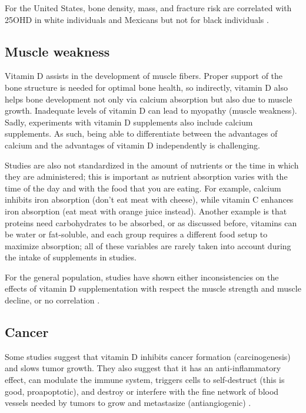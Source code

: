 For the United States, bone density, mass, and fracture risk are correlated with 25OHD in white individuals and Mexicans but not for black individuals \cite{ref:Brown2018, ref:Aloia2019, ref:Aloia2005}.


\subsection{Muscle weakness}

Vitamin D assists in the development of muscle fibers. Proper support of the bone structure is needed for optimal bone health, so indirectly, vitamin D also helps bone development not only via calcium absorption but also due to muscle growth. Inadequate levels of vitamin D can lead to myopathy (muscle weakness). Sadly, experiments with vitamin D supplements also include calcium supplements. As such, being able to differentiate between the advantages of calcium and the advantages of vitamin D independently is challenging.

Studies are also not standardized in the amount of nutrients or the time in which they are administered; this is important as nutrient absorption varies with the time of the day and with the food that you are eating. For example, calcium inhibits iron absorption (don't eat meat with cheese), while vitamin C enhances iron absorption \cite{ref:Li2020, ref:Lynch1980, ref:Li2020}(eat meat with orange juice instead). Another example is that proteins need carbohydrates to be absorbed, or as discussed before, vitamins can be water or fat-soluble, and each group requires a different food setup to maximize absorption; all of these variables are rarely taken into account during the intake of supplements in studies.

For the general population, studies have shown either inconsistencies \cite{ref:screeningErin2014} on the effects of vitamin D supplementation with respect the muscle strength and muscle decline, or no correlation \cite{ref:Shea2019,ref:Vaes2018}.


\subsection{Cancer}

Some studies suggest that vitamin D inhibits cancer formation (carcinogenesis) and slows tumor growth. They also suggest that it has an anti-inflammatory effect, can modulate the immune system, triggers cells to self-destruct (this is good, proapoptotic), and  destroy or interfere with the fine network of blood vessels needed by tumors to grow and metastasize (antiangiogenic) \cite{ref:Manson2017, ref:1_Institute_of_Medicine2011-zg}.

